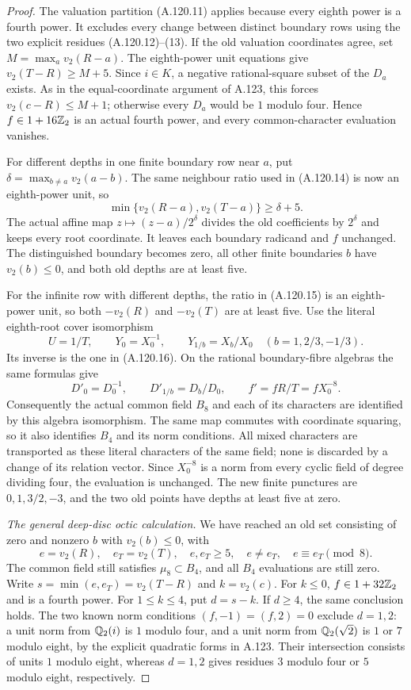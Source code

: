 \begin{proof}
The valuation partition (A.120.11) applies because
every eighth power is a fourth power.
It excludes every change between distinct boundary
rows using the two explicit residues (A.120.12)--(13).
If the old valuation coordinates agree, set
$M=\max_a v_2(R-a)$.
The eighth-power unit equations give
$v_2(T-R)\ge M+5$.
Since $i\in K$, a negative rational-square subset
of the $D_a$ exists.
As in the equal-coordinate argument of A.123,
this forces $v_2(c-R)\le M+1$; otherwise every
$D_a$ would be $1$ modulo four.
Hence $f\in1+16\mathbb Z_2$ is an actual fourth power,
and every common-character evaluation vanishes.

For different depths in one finite boundary row
near $a$, put
$\delta=\max_{b\ne a}v_2(a-b)$.
The same neighbour ratio used in (A.120.14) is now
an eighth-power unit, so
\[
       \min\{v_2(R-a),v_2(T-a)\}\ge\delta+5.
\tag{A.125.14}
\]
The actual affine map $z\mapsto(z-a)/2^\delta$
divides the old coefficients by $2^\delta$ and
keeps every root coordinate.
It leaves each boundary radicand and $f$ unchanged.
The distinguished boundary becomes zero, all other
finite boundaries $b$ have $v_2(b)\le0$, and both
old depths are at least five.

For the infinite row with different depths, the
ratio in (A.120.15) is an eighth-power unit, so
both $-v_2(R)$ and $-v_2(T)$ are at least five.
Use the literal eighth-root cover isomorphism
\[
 U=1/T,\qquad Y_0=X_0^{-1},\qquad
 Y_{1/b}=X_b/X_0\quad(b=1,2/3,-1/3).
\tag{A.125.15}
\]
Its inverse is the one in (A.120.16).
On the rational boundary-fibre algebras the same
formulas give
\[
 D'_0=D_0^{-1},\qquad D'_{1/b}=D_b/D_0,\qquad
 f'=fR/T=fX_0^{-8}.
\tag{A.125.16}
\]
Consequently the actual common field $B_8$ and each
of its characters are identified by this algebra
isomorphism.  The same map commutes with coordinate
squaring, so it also identifies $B_4$ and its norm
conditions.
All mixed characters are transported as these
literal characters of the same field; none is
discarded by a change of its relation vector.
Since $X_0^{-8}$ is a norm from every cyclic field
of degree dividing four, the evaluation is unchanged.
The new finite punctures are $0,1,3/2,-3$, and
the two old points have depths at least five at zero.

\emph{The general deep-disc octic calculation.}
We have reached an old set consisting of zero and
nonzero $b$ with $v_2(b)\le0$, with
\[
 e=v_2(R),\quad e_T=v_2(T),\quad
 e,e_T\ge5,\quad e\ne e_T,\quad e\equiv e_T\pmod8.
\tag{A.125.17}
\]
The common field still satisfies $\mu_8\subset B_4$,
and all $B_4$ evaluations are still zero.
Write $s=\min(e,e_T)=v_2(T-R)$ and $k=v_2(c)$.
For $k\le0$, $f\in1+32\mathbb Z_2$ and is a fourth power.
For $1\le k\le4$, put $d=s-k$.
If $d\ge4$, the same conclusion holds.
The two known norm conditions $(f,-1)=(f,2)=0$
exclude $d=1,2$: a unit norm from $\mathbb Q_2(i)$ is
$1$ modulo four, and a unit norm from
$\mathbb Q_2(\sqrt2)$ is $1$ or $7$ modulo eight, by the
explicit quadratic forms in A.123.
Their intersection consists of units $1$ modulo
eight, whereas $d=1,2$ gives residues $3$ modulo
four or $5$ modulo eight, respectively.


\end{proof}
